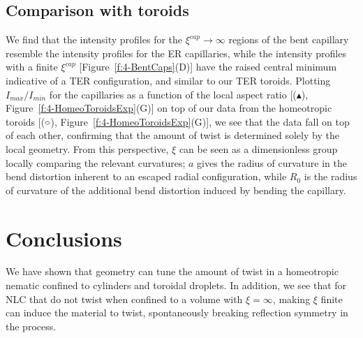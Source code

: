 \subsection{Comparison with toroids}
We find that the intensity profiles for the $\xi^{cap} \rightarrow \infty$ regions of the bent capillary resemble the intensity profiles for the ER capillaries, while the intensity profiles with a finite $\xi^{cap}$ [Figure~\ref{f:4-BentCaps}(D)] have the raised central minimum indicative of a TER configuration, and similar to our TER toroids.
Plotting $I_{max}/I_{min}$ for the capillaries as a function of the local aspect ratio [($\blacktriangle$), Figure~\ref{f:4-HomeoToroidsExp}(G)] on top of our data from the homeotropic toroids [(${\color{blue} \circ}$), Figure~\ref{f:4-HomeoToroidsExp}(G)], we see that the data fall on top of each other, confirming that the amount of twist is determined solely by the local geometry.
From this perspective, $\xi$ can be seen as a dimensionless group locally comparing the relevant curvatures; $a$ gives the radius of curvature in the bend distortion inherent to an escaped radial configuration, while $R_0$ is the radius of curvature of the additional bend distortion induced by bending the capillary.


\section{Conclusions}
We have shown that geometry can tune the amount of twist in a homeotropic nematic confined to cylinders and toroidal droplets.
In addition, we see that for NLC that do not twist when confined to a volume with $\xi = \infty$, making $\xi$ finite can induce the material to twist, spontaneously breaking reflection symmetry in the process.
